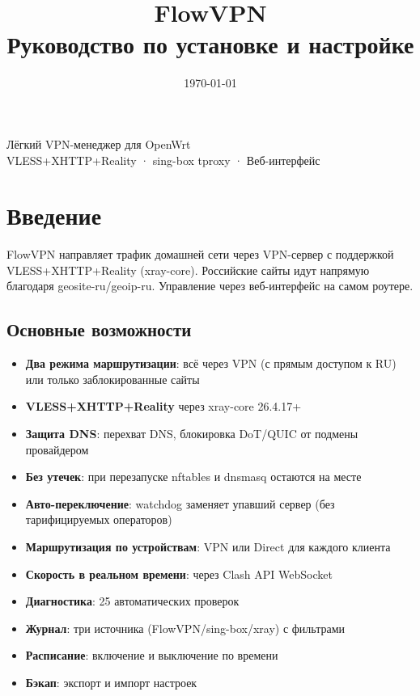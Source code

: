\documentclass[11pt,a4paper]{article}
\title{\vspace{2cm}\Huge\textbf{FlowVPN}\\[0.4em]\large\mdseries Руководство по установке и настройке}
\author{}
\date{\today}
\begin{document}
\maketitle
\thispagestyle{empty}
\vspace{1cm}

\begin{center}
\small Лёгкий VPN-менеджер для OpenWrt \\
VLESS+XHTTP+Reality · sing-box tproxy · Веб-интерфейс
\end{center}

\vspace{2cm}
\tableofcontents
\thispagestyle{empty}
\newpage

\section{Введение}

FlowVPN направляет трафик домашней сети через VPN-сервер с поддержкой VLESS+XHTTP+Reality (xray-core). Российские сайты идут напрямую благодаря geosite-ru/geoip-ru. Управление через веб-интерфейс на самом роутере.

\subsection{Основные возможности}

\begin{itemize}
\item \textbf{Два режима маршрутизации}: всё через VPN (с прямым доступом к RU) или только заблокированные сайты
\item \textbf{VLESS+XHTTP+Reality} через xray-core 26.4.17+
\item \textbf{Защита DNS}: перехват DNS, блокировка DoT/QUIC от подмены провайдером
\item \textbf{Без утечек}: при перезапуске nftables и dnsmasq остаются на месте
\item \textbf{Авто-переключение}: watchdog заменяет упавший сервер (без тарифицируемых операторов)
\item \textbf{Маршрутизация по устройствам}: VPN или Direct для каждого клиента
\item \textbf{Скорость в реальном времени}: через Clash API WebSocket
\item \textbf{Диагностика}: 25 автоматических проверок
\item \textbf{Журнал}: три источника (FlowVPN/sing-box/xray) с фильтрами
\item \textbf{Расписание}: включение и выключение по времени
\item \textbf{Бэкап}: экспорт и импорт настроек
\end{itemize}
\end{document}

